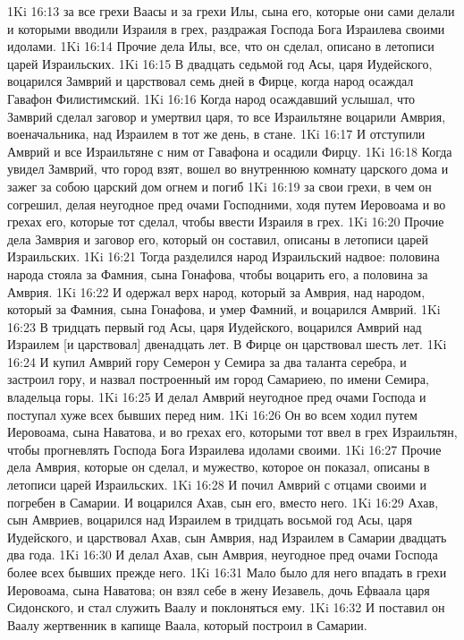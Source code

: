 1Ki 16:13  за все грехи Ваасы и за грехи Илы, сына его, которые они сами делали и которыми вводили Израиля в грех, раздражая Господа Бога Израилева своими идолами.
1Ki 16:14  Прочие дела Илы, все, что он сделал, описано в летописи царей Израильских.
1Ki 16:15  В двадцать седьмой год Асы, царя Иудейского, воцарился Замврий и царствовал семь дней в Фирце, когда народ осаждал Гавафон Филистимский.
1Ki 16:16  Когда народ осаждавший услышал, что Замврий сделал заговор и умертвил царя, то все Израильтяне воцарили Амврия, военачальника, над Израилем в тот же день, в стане.
1Ki 16:17  И отступили Амврий и все Израильтяне с ним от Гавафона и осадили Фирцу.
1Ki 16:18  Когда увидел Замврий, что город взят, вошел во внутреннюю комнату царского дома и зажег за собою царский дом огнем и погиб
1Ki 16:19  за свои грехи, в чем он согрешил, делая неугодное пред очами Господними, ходя путем Иеровоама и во грехах его, которые тот сделал, чтобы ввести Израиля в грех.
1Ki 16:20  Прочие дела Замврия и заговор его, который он составил, описаны в летописи царей Израильских.
1Ki 16:21  Тогда разделился народ Израильский надвое: половина народа стояла за Фамния, сына Гонафова, чтобы воцарить его, а половина за Амврия.
1Ki 16:22  И одержал верх народ, который за Амврия, над народом, который за Фамния, сына Гонафова, и умер Фамний, и воцарился Амврий.
1Ki 16:23  В тридцать первый год Асы, царя Иудейского, воцарился Амврий над Израилем [и царствовал] двенадцать лет. В Фирце он царствовал шесть лет.
1Ki 16:24  И купил Амврий гору Семерон у Семира за два таланта серебра, и застроил гору, и назвал построенный им город Самариею, по имени Семира, владельца горы.
1Ki 16:25  И делал Амврий неугодное пред очами Господа и поступал хуже всех бывших перед ним.
1Ki 16:26  Он во всем ходил путем Иеровоама, сына Наватова, и во грехах его, которыми тот ввел в грех Израильтян, чтобы прогневлять Господа Бога Израилева идолами своими.
1Ki 16:27  Прочие дела Амврия, которые он сделал, и мужество, которое он показал, описаны в летописи царей Израильских.
1Ki 16:28  И почил Амврий с отцами своими и погребен в Самарии. И воцарился Ахав, сын его, вместо него.
1Ki 16:29  Ахав, сын Амвриев, воцарился над Израилем в тридцать восьмой год Асы, царя Иудейского, и царствовал Ахав, сын Амврия, над Израилем в Самарии двадцать два года.
1Ki 16:30  И делал Ахав, сын Амврия, неугодное пред очами Господа более всех бывших прежде него.
1Ki 16:31  Мало было для него впадать в грехи Иеровоама, сына Наватова; он взял себе в жену Иезавель, дочь Ефваала царя Сидонского, и стал служить Ваалу и поклоняться ему.
1Ki 16:32  И поставил он Ваалу жертвенник в капище Ваала, который построил в Самарии.
